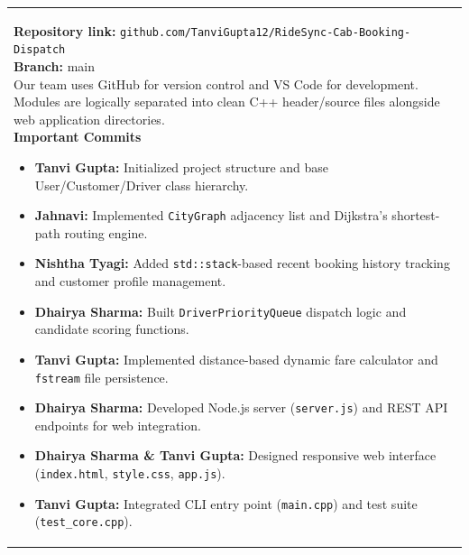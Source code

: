 \documentclass[12pt,a4paper]{article}
\newcommand{\answerbox}[2]{%
    \begin{tabularx}{\textwidth}{
        |>{\RaggedRight\arraybackslash}X|}
        \hline
        \parbox[t][#1][t]{\dimexpr\linewidth-12pt\relax}{
            \vspace{5pt}
            \fontsize{11}{13}\selectfont #2
        }\\
        \hline
    \end{tabularx}
}
\begin{document}
\answerbox{9.0cm}{
\textbf{Repository link:} \texttt{github.com/TanviGupta12/RideSync-Cab-Booking-Dispatch}\\[3pt]
\textbf{Branch:} main\\[5pt]

Our team uses GitHub for version control and VS Code for development. Modules are logically separated into clean C++ header/source files alongside web application directories.\\[5pt]

\textbf{Important Commits}
\vspace{-3pt}

\begin{itemize}
    \setlength{\itemsep}{2pt}
    \setlength{\parskip}{0pt}
    \setlength{\topsep}{2pt}
    \setlength{\leftmargin}{15pt}
    \small

    \item \textbf{Tanvi Gupta:} Initialized project structure and base User/Customer/Driver class hierarchy.

    \item \textbf{Jahnavi:} Implemented \texttt{CityGraph} adjacency list and Dijkstra's shortest-path routing engine.

    \item \textbf{Nishtha Tyagi:} Added \texttt{std::stack}-based recent booking history tracking and customer profile management.

    \item \textbf{Dhairya Sharma:} Built \texttt{DriverPriorityQueue} dispatch logic and candidate scoring functions.

    \item \textbf{Tanvi Gupta:} Implemented distance-based dynamic fare calculator and \texttt{fstream} file persistence.

    \item \textbf{Dhairya Sharma:} Developed Node.js server (\texttt{server.js}) and REST API endpoints for web integration.

    \item \textbf{Dhairya Sharma \& Tanvi Gupta:} Designed responsive web interface (\texttt{index.html}, \texttt{style.css}, \texttt{app.js}).

    \item \textbf{Tanvi Gupta:} Integrated CLI entry point (\texttt{main.cpp}) and test suite (\texttt{test\_core.cpp}).
\end{itemize}
}

\vspace{0.35cm}
\end{document}
